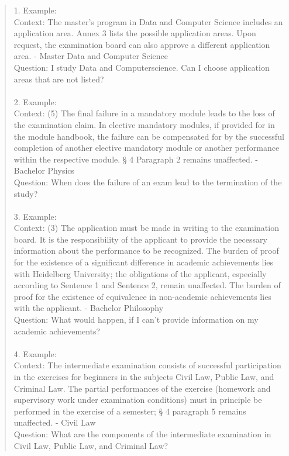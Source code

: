 \begin{quote}
    1. Example:\\
        Context: The master's program in Data and Computer Science includes an application area. Annex 3 lists the possible application areas. Upon request, the examination board can also approve a different application area. - Master Data and Computer Science \\
        Question: I study Data and Computerscience. Can I choose application areas that are not listed? \\ \\
    2. Example: \\
        Context: (5) The final failure in a mandatory module leads to the loss of the examination claim. In elective mandatory modules, if provided for in the module handbook, the failure can be compensated for by the successful completion of another elective mandatory module or another performance within the respective module. § 4 Paragraph 2 remains unaffected. - Bachelor Physics \\
        Question: When does the failure of an exam lead to the termination of the study? \\ \\
    3. Example: \\
        Context: (3) The application must be made in writing to the examination board. It is the responsibility of the applicant to provide the necessary information about the performance to be recognized. The burden of proof for the existence of a significant difference in academic achievements lies with Heidelberg University; the obligations of the applicant, especially according to Sentence 1 and Sentence 2, remain unaffected. The burden of proof for the existence of equivalence in non-academic achievements lies with the applicant. - Bachelor Philosophy \\
        Question: What would happen, if I can't provide information on my academic achievements?\\ \\
    4. Example: \\
        Context: The intermediate examination consists of successful participation in the exercises for beginners in the subjects Civil Law, Public Law, and Criminal Law. The partial performances of the exercise (homework and supervisory work under examination conditions) must in principle be performed in the exercise of a semester; § 4 paragraph 5 remains unaffected. - Civil Law\\
        Question: What are the components of the intermediate examination in Civil Law, Public Law, and Criminal Law? \\
\end{quote}

